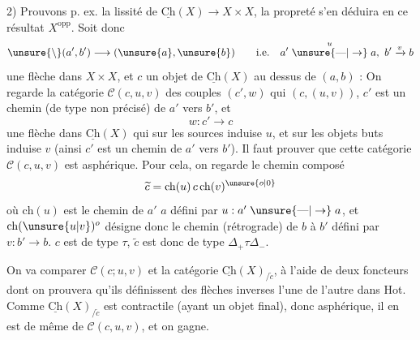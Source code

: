 2) Prouvons p. ex. la lissité de $\underline{\mathrm{Ch}}(X)\to X\times X$, la propreté s'en déduira en  ce résultat  $X^{\mathrm{opp}}$. Soit donc
\[
\unsure{\backslash}(a',b')\longrightarrow(\unsure{a},\unsure{b})\qquad\text{i.e.}\quad a'\mathrel{\overset{u}{\unsure{\text{---}|\to}}}a,\ b'\xrightarrow{v}b
\]
une flèche dans $X\times X$, et $c$ un objet de $\underline{\mathrm{Ch}}(X)$ au dessus de $(a,b)$ :
On regarde la catégorie $\mathcal C(c,u,v)$ des couples $(c',w)$ qui  $(c,(u,v))$,   $c'$ est un chemin (de type non précisé) de $a'$ vers $b'$, et 
\[
w:c'\longrightarrow c
\]
une flèche dans $\underline{\mathrm{Ch}}(X)$ qui sur les sources induise $u$, et sur les objets buts induise $v$ (ainsi $c'$ est un chemin de $a'$ vers $b'$). Il faut
prouver que cette catégorie $\mathcal C(c,u,v)$ est asphérique. Pour cela, on regarde le chemin composé
\[
\widetilde c=\mathrm{ch}(u)\,c\,\mathrm{ch}(v)^{\unsure{o|0}}
\]
où $\mathrm{ch}(u)$ est le chemin  de $a'$  $a$ défini par $u:a'\mathrel{\unsure{\text{---}|\to}}a$, et $\mathrm{ch}(\unsure{u|v})^o$ désigne donc le chemin (rétrograde) de $b$ à $b'$ défini par $v:b'\to b$.  $c$ est de type $\tau$, $\widetilde c$ est donc de type $\Delta_+\tau\Delta_-$.

On va comparer $\mathcal C(c;u,v)$ et la catégorie $\underline{\mathrm{Ch}}(X)_{/\widetilde c}$, à l'aide de deux foncteurs
dont on prouvera qu'ils définissent des flèches inverses l'une de l'autre dans Hot. Comme $\underline{\mathrm{Ch}}(X)_{/\widetilde c}$ est contractile (ayant un objet final), donc asphérique, il en est de même de $\mathcal C(c,u,v)$, et on gagne.

